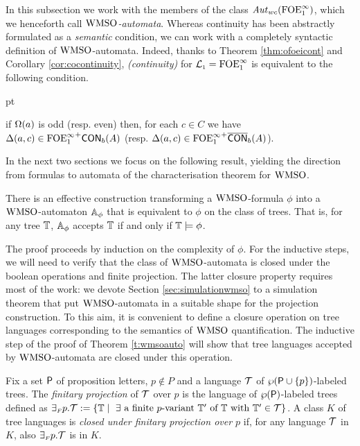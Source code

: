 

In this subsection we work with the members of the class $\mathit{Aut}_{wc}(\mathrm{FOE}^{\infty}_1)$, which we henceforth call \emph{$\mathrm{WMSO}$-automata}. Whereas continuity has been abstractly formulated as a \emph{semantic} condition, we can work with a completely syntactic definition of $\mathrm{WMSO}$-automata. Indeed, thanks to Theorem \ref{thm:ofoeicont} and Corollary \ref{cor:cocontinuity}, \emph{(continuity)} for $\mathcal{L}_{\scriptscriptstyle 1} = \mathrm{FOE}^{\infty}_1$ is equivalent to the following condition. 
\begin{description}
	 pt
	\item[(continuity, syntactically)] if $\Omega(a)$ is odd (resp. even) then, for each $c\in C$ we have
	   $\Delta(a,c) \in {\ensuremath{\mathrm{FOE}^{\infty}_1}}^+\mathsf{CON}_{b}(A)$ (resp. $\Delta(a,c) \in {\ensuremath{\mathrm{FOE}^{\infty}_1}}^+\overline{\mathsf{CON}}_{b}(A)$).
\end{description} 

In the next two sections we focus on the following result, yielding the direction from formulas to automata of the characterisation theorem for $\mathrm{WMSO}$.

\begin{theorem}
\label{t:wmsoauto}
There is an effective construction transforming a $\mathrm{WMSO}$-formula $\phi$
into a $\mathrm{WMSO}$-automaton $\mathbb{A}_{\phi}$ that is equivalent
to $\phi$ on the class of trees.
That is, for any tree $\mathbb{T}$, $\mathbb{A}_{\phi}$ accepts $\mathbb{T}$ if and only if $\mathbb{T} \models {\phi}$.
\end{theorem}

The proof proceeds by induction on the complexity of
$\phi$. For the inductive steps, we will need to verify that the class of
$\mathrm{WMSO}$-automata is closed under the boolean operations and finite projection.
The latter closure property requires most of the work: we devote Section \ref{sec:simulationwmso} to a simulation theorem that put $\mathrm{WMSO}$-automata in a suitable shape
for the projection construction.
%
To this aim, it is convenient to define a closure operation on tree languages corresponding
to the semantics of $\mathrm{WMSO}$ quantification. The inductive step of the proof of Theorem \ref{t:wmsoauto} will show that tree languages accepted by $\mathrm{WMSO}$-automata are closed under this operation.

\begin{definition}\label{def:tree_finproj}
Fix a set $\mathsf{P}$ of proposition letters, $p \not\in P$ and a language $\mathcal{T}$ of $\wp (\mathsf{P}\cup\{p\})$-labeled
trees.
The \emph{finitary projection} of $\mathcal{T}$ over $p$ is the language of $\wp (\mathsf{P})$-labeled trees defined as ${\finexists} p.\trees \df \{\bbT \mid \text{ $\exists$ a finite $p$-variant } \bbT' \text{ of } \bbT \text{ with } \bbT' \in \trees\}$.
%
A class $K$ of tree languages is \emph{closed under finitary projection
over $p$} if, for any language $\mathcal{T}$ in $K$, also ${{\exists_{{\scriptscriptstyle F}}} p}.\mathcal{T}$ is in $K$.
\end{definition} 



